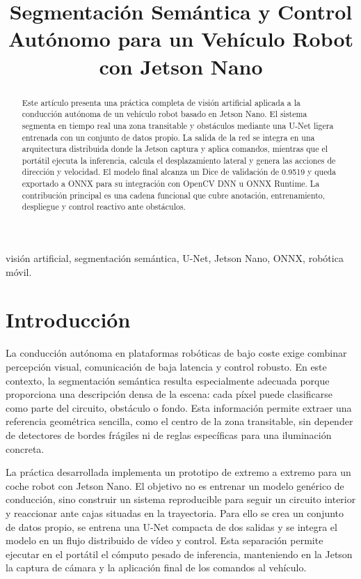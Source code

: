 \documentclass[conference,a4paper]{IEEEtran}
\title{Segmentaci\'on Sem\'antica y Control Aut\'onomo para un Veh\'iculo Robot con Jetson Nano}
\author{
\IEEEauthorblockN{Juan Jos\'e Prado Neira \quad Javier Rego Bargos}
\IEEEauthorblockA{Trabajo de Visi\'on Avanzada, TFM}
}
\begin{document}
\maketitle

\begin{abstract}
Este art\'iculo presenta una pr\'actica completa de visi\'on artificial aplicada a la conducci\'on aut\'onoma de un veh\'iculo robot basado en Jetson Nano. El sistema segmenta en tiempo real una zona transitable y obst\'aculos mediante una U-Net ligera entrenada con un conjunto de datos propio. La salida de la red se integra en una arquitectura distribuida donde la Jetson captura y aplica comandos, mientras que el port\'atil ejecuta la inferencia, calcula el desplazamiento lateral y genera las acciones de direcci\'on y velocidad. El modelo final alcanza un Dice de validaci\'on de 0.9519 y queda exportado a ONNX para su integraci\'on con OpenCV DNN u ONNX Runtime. La contribuci\'on principal es una cadena funcional que cubre anotaci\'on, entrenamiento, despliegue y control reactivo ante obst\'aculos.
\end{abstract}

\begin{IEEEkeywords}
visi\'on artificial, segmentaci\'on sem\'antica, U-Net, Jetson Nano, ONNX, rob\'otica m\'ovil.
\end{IEEEkeywords}

\section{Introducci\'on}
La conducci\'on aut\'onoma en plataformas rob\'oticas de bajo coste exige combinar percepci\'on visual, comunicaci\'on de baja latencia y control robusto. En este contexto, la segmentaci\'on sem\'antica resulta especialmente adecuada porque proporciona una descripci\'on densa de la escena: cada p\'ixel puede clasificarse como parte del circuito, obst\'aculo o fondo. Esta informaci\'on permite extraer una referencia geom\'etrica sencilla, como el centro de la zona transitable, sin depender de detectores de bordes fr\'agiles ni de reglas espec\'ificas para una iluminaci\'on concreta.

La pr\'actica desarrollada implementa un prototipo de extremo a extremo para un coche robot con Jetson Nano. El objetivo no es entrenar un modelo gen\'erico de conducci\'on, sino construir un sistema reproducible para seguir un circuito interior y reaccionar ante cajas situadas en la trayectoria. Para ello se crea un conjunto de datos propio, se entrena una U-Net compacta de dos salidas y se integra el modelo en un flujo distribuido de v\'ideo y control. Esta separaci\'on permite ejecutar en el port\'atil el c\'omputo pesado de inferencia, manteniendo en la Jetson la captura de c\'amara y la aplicaci\'on final de los comandos al veh\'iculo.
\end{document}
